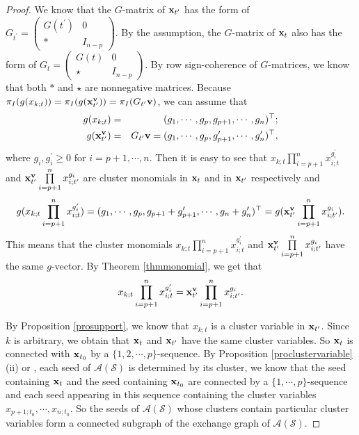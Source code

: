 \documentclass[14pt]{amsart}
\begin{document}
\begin{proof}
We know that the $G$-matrix of ${\bf x}_{t^\prime}$ has the form of $G_{t^{\prime}}=\begin{pmatrix}G(t^{\prime})&0\\ \ast& I_{n-p}\end{pmatrix}$. By the assumption, the $G$-matrix of ${\bf x}_t$ also has the form of $G_{t}=\begin{pmatrix}G(t)&0\\ \star& I_{n-p}\end{pmatrix}$.
By row sign-coherence of $G$-matrices, we know that both $\ast$ and $\star$ are nonnegative matrices.
Because $\pi_I(g(x_{k;t}))=\pi_I(g({\bf x}_{t^{\prime}}^{{\bf v}}))=\pi_I(G_{t^{\prime}}{\bf v})$, we can assume that
\begin{eqnarray}
g(x_{k;t})&=&(g_1,\cdots,g_p,g_{p+1},\cdots,g_n)^{\top};\nonumber\\
g({\bf x}_{t^{\prime}}^{{\bf v}})&=&G_{t^{\prime}}{\bf v}=(g_1,\cdots,g_p,g_{p+1}^{\prime},\cdots,g_n^{\prime})^{\top},\nonumber
\end{eqnarray}
where $g_i,g_i^{\prime}\geq 0$ for $i=p+1,\cdots,n$. Then it is easy to see that $x_{k;t}\prod\limits_{i=p+1}^nx_{i;t}^{g_i^{\prime}}$ and ${\bf x}_{t^{\prime}}^{{\bf v}}\prod\limits_{i=p+1}^nx_{i;t^{\prime}}^{g_i}$ are cluster monomials in ${\bf x}_t$ and in ${\bf x}_{t^{\prime}}$ respectively and
\begin{eqnarray}
g(x_{k;t}\prod\limits_{i=p+1}^nx_{i;t}^{g_i^{\prime}})=(g_1,\cdots,g_p,g_{p+1}+g_{p+1}^{\prime},
\cdots,g_{n}+g_{n}^{\prime})^{\top}=g({\bf x}_{t^{\prime}}^{{\bf v}}\prod\limits_{i=p+1}^nx_{i;t^{\prime}}^{g_i}).\nonumber
\end{eqnarray}
This means that the cluster monomials $x_{k;t}\prod\limits_{i=p+1}^nx_{i;t}^{g_i^{\prime}}$ and ${\bf x}_{t^{\prime}}^{{\bf v}}\prod\limits_{i=p+1}^nx_{i;t^{\prime}}^{g_i}$ have the same $g$-vector. By Theorem \ref{thmmonomial}, we get that $$x_{k;t}\prod\limits_{i=p+1}^nx_{i;t}^{g_i^{\prime}}={\bf x}_{t^{\prime}}^{{\bf v}}\prod\limits_{i=p+1}^nx_{i;t^{\prime}}^{g_i}.$$

By Proposition \ref{prosupport}, we know that $x_{k;t}$ is a cluster variable in ${\bf x}_{t^\prime}$.
 Since $k$ is arbitrary, we obtain that ${\bf x}_{t}$ and ${\bf x}_{t^{\prime}}$ have the same cluster variables. So ${\bf x}_t$
is connected with ${\bf x}_{t_0}$ by a $\{1,2,\cdots,p\}$-sequence. By Proposition \ref{proclustervariable} (ii) or \cite[Theorem 4]{GSV}, each seed of $\mathcal A(\mathcal S)$ is determined by its cluster, we know that the seed containing ${\bf x}_{t}$ and the seed containing ${\bf x}_{t_0}$ are connected by a $\{1,\cdots,p\}$-sequence and each seed appearing in this sequence containing the cluster variables $x_{p+1;t_0},\cdots,x_{n;t_0}$. So the seeds of $\mathcal A(\mathcal S)$ whose clusters contain particular cluster variables form a connected subgraph of the exchange graph of $\mathcal A(\mathcal S)$.
\end{proof}
\end{document}
